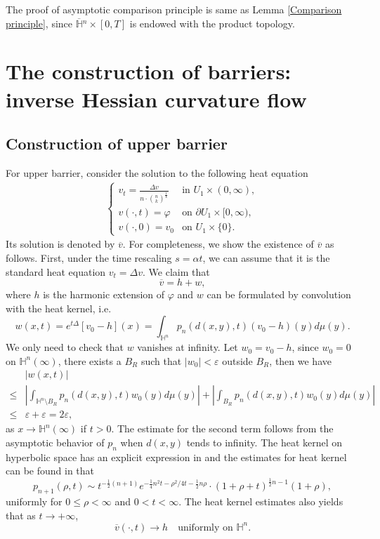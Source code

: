 \documentclass[reqno]{amsart}
\theoremstyle{remark}
\theoremstyle{definition}
\numberwithin{equation}{section}
\begin{document}
The proof of asymptotic comparison principle is same as Lemma \ref{Comparison principle}, since $\overline{\mathbb{H}}{}^n \times [0,T]$ is endowed with the product topology.


\section{The construction of barriers: inverse Hessian curvature flow}

\subsection{Construction of upper barrier}

For upper barrier, consider the solution to the following heat equation
\begin{align}
    \begin{cases}
    v_t = \frac{\Delta v}{n \cdot \binom{n}{k}^{\frac{1}{k}}} & \text{in } U_1 \times (0, \infty), \\[4pt]
    v(\cdot, t) = \varphi & \text{on } \partial U_1 \times [0, \infty), \\[4pt]
    v(\cdot, 0) = v_0 & \text{on } U_1 \times \{0\}. \label{heat equation}
    \end{cases}
\end{align}
Its solution is denoted by $\overline{v}$. For completeness, we show the existence of $\overline{v}$ as follows. First, under the time rescaling $s = \alpha t$, we can assume that it is the standard heat equation $v_t = \Delta v$. We claim that 
\[
\overline{v} = h + w,
\]
where $h$ is the harmonic extension of $\varphi$ and $w$ can be formulated by convolution with the heat kernel, i.e.
\[
w(x, t) = e^{t\Delta} \left[ v_0 - h \right](x) = \int_{\mathbb{H}^n} p_n(d(x,y), t)(v_0 - h)(y) d\mu(y).
\]
We only need to check that $w$ vanishes at infinity. Let $w_0 = v_0 - h$, since $w_0 = 0$ on $\mathbb{H}^n(\infty)$, there exists a $B_R$ such that $|w_0| < \varepsilon$ outside $B_R$, then we have
\begin{align*}
    &|w(x, t)| \\
    \leqslant& \left| \int_{\mathbb{H}^n \setminus B_R} p_n(d(x,y), t)w_0(y) d\mu(y) \right| + \left| \int_{B_R} p_n(d(x,y), t)w_0(y) d\mu(y) \right| \\
    \leqslant& \varepsilon + \varepsilon = 2\varepsilon,
\end{align*}
as $x \to \mathbb{H}^n(\infty)$ if $t>0$. The estimate for the second term follows from the asymptotic behavior of $p_n$ when $d(x,y)$ tends to infinity. The heat kernel on hyperbolic space has an explicit expression in \cite[Theorem 1.1]{TheHeatKernel} and the estimates for heat kernel can be found in \cite[Theorem 3.1]{HeatKernelBoundsonHyperbolicSpaceandKleinianGroups} that 
\[
p_{n+1}(\rho, t) \sim t^{-\frac{1}{2}(n+1)} e^{-\frac{1}{4}n^2 t - \rho^2/4t - \frac{1}{2}n\rho} \cdot (1 + \rho + t)^{\frac{1}{2}n-1}(1 + \rho),
\]
uniformly for $0 \leqslant \rho < \infty$ and $0 < t < \infty$. The heat kernel estimates also yields that as $t \to +\infty$,
\[
\overline{v}(\cdot, t) \rightarrow h \quad \text{uniformly on } \mathbb{H}^n.
\]
\end{document}
